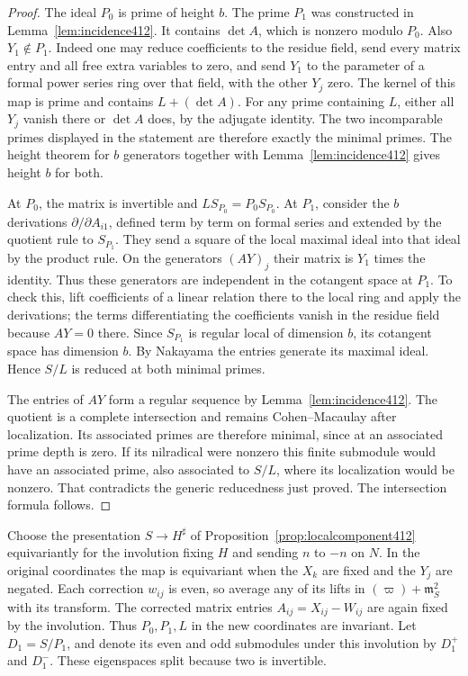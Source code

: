 \documentclass[a4paper,11pt]{article}
\theoremstyle{definition}
\theoremstyle{remark}
\numberwithin{equation}{section}
\begin{document}
\begin{proof}
The ideal \(P_0\) is prime of height \(b\).
The prime \(P_1\) was constructed in
Lemma~\ref{lem:incidence412}. It contains \(\det A\), which
is nonzero modulo \(P_0\). Also \(Y_1\notin P_1\). Indeed
one may reduce coefficients to the residue field, send
every matrix entry and all free extra variables to zero,
and send \(Y_1\) to the parameter of a formal power series
ring over that field, with the other \(Y_j\) zero. The
kernel of this map is prime and contains \(L+(\det A)\).
For any prime containing \(L\), either all \(Y_j\) vanish
there or \(\det A\) does, by the adjugate identity.
The two incomparable primes displayed in the statement are
therefore exactly the minimal primes. The height theorem
for \(b\) generators together with Lemma~\ref{lem:incidence412}
gives height \(b\) for both.

At \(P_0\), the matrix is invertible and \(L S_{P_0}=P_0 S_{P_0}\).
At \(P_1\), consider the \(b\) derivations
\(\partial/\partial A_{i1}\), defined term by term on
formal series and extended by the quotient rule to
\(S_{P_1}\). They send a square of the local maximal ideal
into that ideal by the product rule. On the generators
\((AY)_j\) their matrix is \(Y_1\) times the identity.
Thus these generators are independent in the cotangent
space at \(P_1\). To check this, lift coefficients of a
linear relation there to the local ring and apply the
derivations; the terms differentiating the coefficients
vanish in the residue field because \(AY=0\) there.
Since \(S_{P_1}\) is regular local of dimension \(b\), its
cotangent space has dimension \(b\). By Nakayama the entries
generate its maximal ideal. Hence \(S/L\) is reduced at
both minimal primes.

The entries of \(AY\) form a regular sequence by
Lemma~\ref{lem:incidence412}. The quotient is a complete
intersection and remains Cohen--Macaulay after localization.
Its associated primes are therefore minimal, since at
an associated prime depth is zero. If its nilradical
were nonzero this finite submodule would have an associated
prime, also associated to \(S/L\), where its localization
would be nonzero. That contradicts the generic reducedness
just proved. The intersection formula follows.
\end{proof}

Choose the presentation \(S\to H^\sharp\) of
Proposition~\ref{prop:localcomponent412} equivariantly
for the involution fixing \(H\) and sending \(n\) to
\(-n\) on \(N\). In the original coordinates the map is
equivariant when the \(X_k\) are fixed and the \(Y_j\)
are negated. Each correction \(w_{ij}\) is even, so
average any of its lifts in \((\varpi)+\mathfrak m_S^2\)
with its transform. The corrected matrix entries
\(A_{ij}=X_{ij}-W_{ij}\) are again fixed by the involution.
Thus \(P_0,P_1,L\) in the new coordinates are invariant.
Let \(D_1=S/P_1\), and denote its even and odd submodules
under this involution by \(D_1^+\) and \(D_1^-\).
These eigenspaces split because two is invertible.
\end{document}
